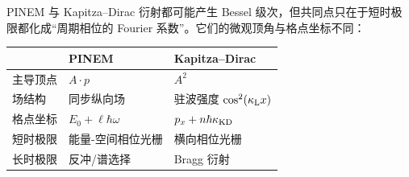 PINEM 与 Kapitza--Dirac 衍射都可能产生 Bessel 级次，但共同点只在于短时极限都化成“周期相位的 Fourier 系数”。它们的微观顶角与格点坐标不同：
\begin{center}
\begin{tabular}{lll}
\toprule
 & PINEM & Kapitza--Dirac\\
\midrule
主导顶点 & $A\!\cdot\!p$ & $A^2$\\
场结构 & 同步纵向场 & 驻波强度 $\cos^2(\kappa_{\rm L}x)$\\
格点坐标 & $E_0+\ell\hbar\omega$ & $p_x+n\hbar\kappa_{\rm KD}$\\
短时极限 & 能量-空间相位光栅 & 横向相位光栅\\
长时极限 & 反冲/谱选择 & Bragg 衍射\\
\bottomrule
\end{tabular}
\end{center}
